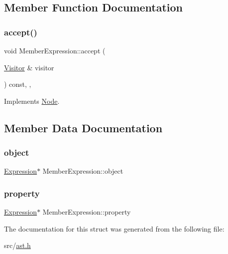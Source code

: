 \subsection{Member Function Documentation}
\mbox{\label{struct_member_expression_a04c3360eda4db02e733746882830b92c}} 
\subsubsection{\texorpdfstring{accept()}{accept()}}
{\footnotesize\ttfamily void Member\+Expression\+::accept (\begin{DoxyParamCaption}\item[{\hyperlink{struct_visitor}{Visitor} \&}]{visitor }\end{DoxyParamCaption}) const\hspace{0.3cm}{\ttfamily [inline]}, {\ttfamily [override]}, {\ttfamily [virtual]}}



Implements \hyperlink{struct_node_a10bd7af968140bbf5fa461298a969c71}{Node}.



\subsection{Member Data Documentation}
\mbox{\label{struct_member_expression_a338f9515daed926c07fd717b9b728f58}} 
\subsubsection{\texorpdfstring{object}{object}}
{\footnotesize\ttfamily \hyperlink{struct_expression}{Expression}$\ast$ Member\+Expression\+::object}

\mbox{\label{struct_member_expression_a7b33bb4629162523bddbb397b180e31e}} 
\subsubsection{\texorpdfstring{property}{property}}
{\footnotesize\ttfamily \hyperlink{struct_expression}{Expression}$\ast$ Member\+Expression\+::property}



The documentation for this struct was generated from the following file\+:\begin{DoxyCompactItemize}
\item 
src/\hyperlink{ast_8h}{ast.\+h}\end{DoxyCompactItemize}
